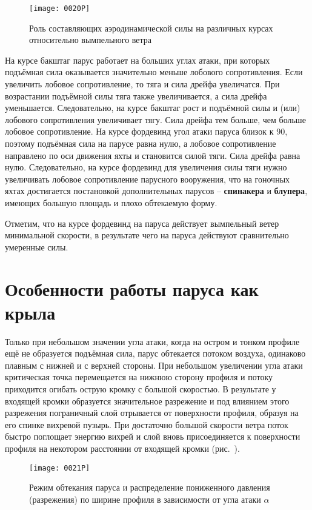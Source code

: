 \begin{figure*}[htb]
  \centering
  \texttt{[image: 0020P]}
  \caption{Роль составляющих аэродинамической силы на различных курсах относительно вымпельного ветра}
  \label{fig:20}
\end{figure*}

На курсе бакштаг парус работает на больших углах атаки, при которых подъёмная сила оказывается значительно меньше лобового сопротивления. Если увеличить лобовое сопротивление, то тяга и сила дрейфа увеличатся. При возрастании подъёмной силы тяга также увеличивается, а сила дрейфа уменьшается. Следовательно, на курсе бакштаг рост и подъёмной силы и (или) лобового сопротивления увеличивает тягу. Сила дрейфа тем больше, чем больше лобовое сопротивление. На курсе фордевинд угол атаки паруса близок к 90\gr, поэтому подъёмная сила на парусе равна нулю, а лобовое сопротивление направлено по оси движения яхты и становится силой тяги. Сила дрейфа равна нулю. Следовательно, на курсе фордевинд для увеличения силы тяги нужно увеличивать лобовое сопротивление парусного вооружения, что на гоночных яхтах достигается постановкой дополнительных парусов \--- \textbf{спинакера} и \textbf{блупера}, имеющих большую площадь и плохо обтекаемую форму. 

Отметим, что на курсе фордевинд на паруса действует вымпельный ветер минимальной скорости, в результате чего на паруса действуют сравнительно умеренные силы.

\section{Особенности работы паруса как крыла}

Только при небольшом значении угла атаки, когда на остром и тонком профиле ещё не образуется подъёмная сила, парус обтекается потоком воздуха, одинаково плавным с нижней и с верхней стороны. При небольшом увеличении угла атаки критическая точка перемещается на нижнюю сторону профиля и потоку приходится огибать острую кромку с большой скоростью. В результате у входящей кромки образуется значительное разрежение и под влиянием этого разрежения пограничный слой отрывается от поверхности профиля, образуя на его спинке вихревой пузырь. При достаточно большой скорости ветра поток быстро поглощает энергию вихрей и слой вновь  присоединяется к поверхности профиля на некотором расстоянии от входящей кромки (рис.~).

\begin{figure*}[htb]
  \centering
  \texttt{[image: 0021P]}
  \caption{Режим обтекания паруса и распределение пониженного давления (разрежения) по ширине профиля в зависимости от угла атаки $\alpha$}
  \label{fig:21}
\end{figure*}

